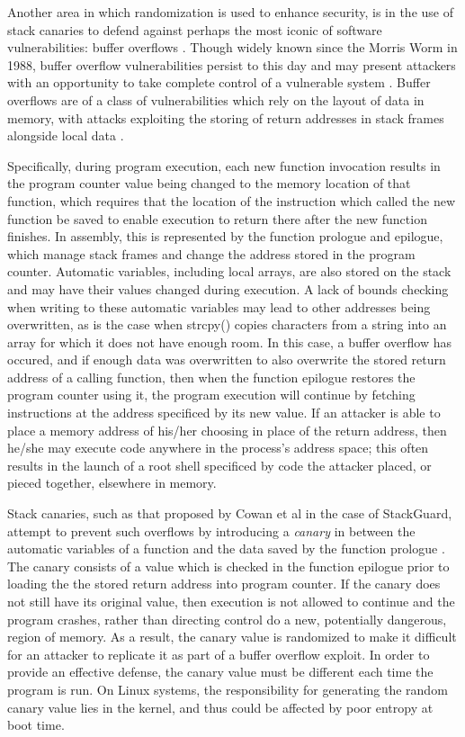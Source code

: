 Another area in which randomization is used to enhance security, is in the use of stack canaries to defend against perhaps the most iconic of software vulnerabilities: buffer overflows \cite{stackguard, stackguardUse}.  Though widely known since the Morris Worm in 1988, buffer overflow vulnerabilities persist to this day and may present attackers with an opportunity to take complete control of a vulnerable system \cite{buff_overflow_today}. Buffer overflows are of a class of vulnerabilities which rely on the layout of  data in memory, with attacks exploiting the storing of return addresses in stack frames alongside local data \cite{aleph, lowLevSec}. 

Specifically, during program execution, each new function invocation results in the program counter value being changed to the memory location of that function, which requires that the location of the instruction which called the new function be saved to enable execution to return there after the new function finishes. In assembly, this is represented by the function prologue and epilogue, which manage stack frames and change the address stored in the program counter.  Automatic variables, including local arrays, are also stored on the stack and may have their values changed during execution.  A lack of bounds checking when writing to these automatic variables may lead to other addresses being overwritten, as is the case when strcpy() copies characters from a string into an array for which it does not have enough room.  In this case, a buffer overflow has occured, and if enough data was overwritten to also overwrite the stored return address of a calling function, then when the function epilogue restores the program counter using it, the program execution will continue by fetching instructions at the address specificed by its new value.  If an attacker is able to place a memory address of his/her choosing in place of the return address, then he/she may execute code anywhere in the process's address space; this often results in the launch of a root shell specificed by code the attacker placed, or pieced together, elsewhere in memory.

Stack canaries, such as that proposed by Cowan et al in the case of StackGuard, attempt to prevent such overflows by introducing a \textit{canary} in between the automatic variables of a function and the data saved by the function prologue \cite{stackguard}.  The canary consists of a value which is checked in the function epilogue prior to loading the the stored return address into program counter.  If the canary does not still have its original value, then execution is not allowed to continue and the program crashes, rather than directing control do a new, potentially dangerous, region of memory.  As a result, the canary value is randomized to make it difficult for an attacker to replicate it as part of a buffer overflow exploit.  In order to provide an effective defense, the canary value must be different each time the program is run.  On Linux systems, the responsibility for generating the random canary value lies in the kernel, and thus could be affected by poor entropy at boot time.


